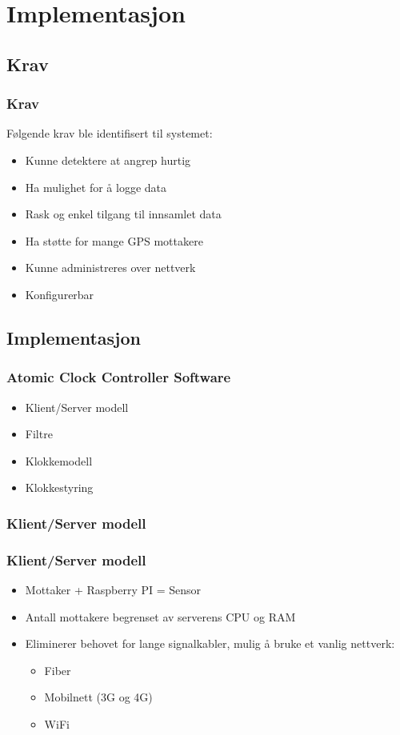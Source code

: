 \documentclass[xcolor=table]{beamer}
\begin{document}
\section{Implementasjon}
\subsection{Krav}
\begin{frame}
  \frametitle{Krav}
  Følgende krav ble identifisert til systemet:
  \begin{itemize}
    \item Kunne detektere at angrep hurtig
    \item Ha mulighet for å logge data
    \item Rask og enkel tilgang til innsamlet data
    \item Ha støtte for mange GPS mottakere
    \item Kunne administreres over nettverk
    \item Konfigurerbar 
  \end{itemize}
\end{frame}

\subsection{Implementasjon}
\begin{frame}
  \frametitle{Atomic Clock Controller Software}
  \begin{itemize}
    \item Klient/Server modell
    \item Filtre
    \item Klokkemodell
    \item Klokkestyring
  \end{itemize}
\end{frame}

\subsubsection{Klient/Server modell}
\begin{frame}
  \frametitle{Klient/Server modell}
  \begin{itemize}
    \item Mottaker + Raspberry PI = Sensor
    \item Antall mottakere begrenset av serverens CPU og RAM
    \item Eliminerer behovet for lange signalkabler, mulig å bruke et vanlig nettverk:
    \begin{itemize}
      \item Fiber
      \item Mobilnett (3G og 4G)
      \item WiFi
    \end{itemize}
  \end{itemize}
\end{frame}
\end{document}
